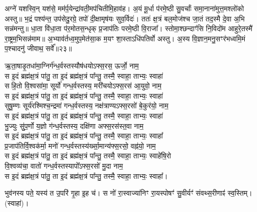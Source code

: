 अग्ने॑ यशस्वि॒न् यश॑से॒ मम॑र्प॒येन्द्रा॑वती॒मप॑चितीमि॒हाव॑ह।
अ॒यं मू॒र्धा प॑रमे॒ष्ठी सु॒वर्चाः᳚ समा॒नाना॑मुत्त॒मश्लो॑को अस्तु॥
भ॒द्रं पश्य॑न्त॒ उप॑सेदु॒रग्रे॒ तपो॑ दी॒क्षामृष॑यः सुव॒र्विदः॑।
ततः॑ क्ष॒त्रं बल॒मोज॑श्च जा॒तं तद॒स्मै दे॒वा अ॒भि सन्न॑मन्तु॥
धा॒ता वि॑धा॒ता प॑र॒मोतस॒न्धृक् प्र॒जाप॑तिः परमे॒ष्ठी वि॒राजा᳚।
स्तोमा॒श्छन्दाꣳ॑सि नि॒विदो॑म आहुरे॒तस्मै॑ रा॒ष्ट्रम॒भिसन्न॑माम॥
अ॒भ्याव॑र्तध्व॒मुप॒मेत॑सा॒क म॒यꣳ शा॒स्ताऽधि॑पतिर्वो अस्तु।
अ॒स्य वि॒ज्ञान॒मनु॒सꣳर॑भध्वमि॒मं प॒श्चादनु॑ जीवाथ॒ सर्वे᳚॥२३॥


ऋ॒ता॒षाडृ॒तधा॑मा॒ग्निर्ग॑न्ध॒र्वस्तस्यौष॑धयोऽफ्स॒रस॒ ऊर्जो॒ नाम॒\\
स इ॒दं ब्रह्म॑क्ष॒त्रं पा॑तु॒ ता इ॒दं ब्रह्म॑क्ष॒त्रं पा᳚न्तु॒ तस्मै॒ स्वाहा॒ ताभ्यः॒ स्वाहा॑\\
सहि॒तो वि॒श्वसा॑मा॒ सूर्यो॑ गन्ध॒र्वस्तस्य॒ मरी॑चयोऽफ्स॒रस॑ आ॒युवो॒ नाम॒\\
स इ॒दं ब्रह्म॑क्ष॒त्रं पा॑तु॒ ता इ॒दं ब्रह्म॑क्ष॒त्रं पा᳚न्तु॒ तस्मै॒ स्वाहा॒ ताभ्यः॒ स्वाहा॑\\
सुषु॒म्णः सूर्य॑रश्मिश्च॒न्द्रमा॑ गन्ध॒र्वस्तस्य॒ नक्ष॑त्राण्यऽफ्स॒रसो॑ बे॒कुर॑यो॒ नाम॒\\
स इ॒दं ब्रह्म॑क्ष॒त्रं पा॑तु॒ ता इ॒दं ब्रह्म॑क्ष॒त्रं पा᳚न्तु॒ तस्मै॒ स्वाहा॒ ताभ्यः॒ स्वाहा॑\\
भु॒ज्युः सुु॑प॒र्णो य॒ज्ञो ग॑न्ध॒र्वस्तस्य॒ दक्षि॑णा अफ्स॒रस॑स्त॒वा नाम॒\\
स इ॒दं ब्रह्म॑क्ष॒त्रं पा॑तु॒ ता इ॒दं ब्रह्म॑क्ष॒त्रं पा᳚न्तु॒ तस्मै॒ स्वाहा॒ ताभ्यः॒ स्वाहा᳚\\
प्र॒जाप॑तिर्वि॒श्वक॑र्मा॒ मनो॑ गन्ध॒र्वस्तस्य॑र्ख्सा॒मान्य॑फ्स॒रसो॒ वह्न॑यो॒  नाम॒\\
स इ॒दं ब्रह्म॑क्ष॒त्रं पा॑तु॒ ता इ॒दं ब्रह्म॑क्ष॒त्रं पा᳚न्तु॒ तस्मै॒ स्वाहा॒ ताभ्यः॒ स्वाहे॑षि॒रो\\
वि॒श्वव्य॑चा॒ वातो॑ गन्ध॒र्वस्तस्यापो᳚ऽफ्स॒रसो॑ मु॒दा नाम॒\\
स इ॒दं ब्रह्म॑क्ष॒त्रं पा॑तु॒ ता इ॒दं ब्रह्म॑क्ष॒त्रं पा᳚न्तु॒ तस्मै॒ स्वाहा॒ ताभ्यः॒ स्वाहा᳚।

भुव॑नस्य पते॒ यस्य॑ त उ॒परि॑ गृ॒हा इ॒ह च॑।
स नो॑ रा॒स्वाज्या॑निꣳ रा॒यस्पोषꣳ॑ सु॒वीर्यꣳ॑ संवथ्स॒रीणाꣴ॑ स्व॒स्तिम्। (स्वाहा॑)।


